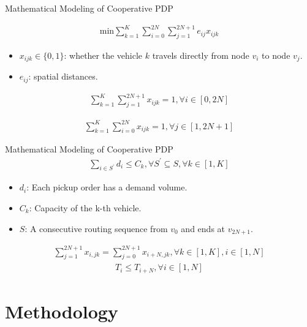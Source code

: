 \documentclass{beamer}
\begin{document}
\begin{frame}{Mathematical Modeling of Cooperative PDP}
	\centering

	\begin{align}
		\mathrm{min} \sum_{k=1}^{K}\sum_{i=0}^{2N}\sum_{j=1}^{2N+1}e_{ij}x_{ijk}
	\end{align}
	\begin{itemize}
		\small
		\item $x_{ijk}\in\{0,1\}$: whether the vehicle $k$ travels directly from node $v_i$ to node $v_j$.
		\item $e_{ij}$: spatial distances.
	\end{itemize}
	\begin{align}
		\sum_{k=1}^{K}\sum_{j=1}^{2N+1}x_{ijk}=1,\forall i\in[0,2N]
	\end{align}

	\begin{align}
		\sum_{k=1}^{K}\sum_{i=0}^{2N}x_{ijk}=1,\forall j\in[1,2N+1]
	\end{align}
\end{frame}

\begin{frame}{Mathematical Modeling of Cooperative PDP}
	\begin{align}
		\sum_{i\in S^{\prime}}d_{i}\leq C_{k},\forall S^{\prime}\subseteq S,\forall k\in[1,K]
	\end{align}
	\begin{itemize}
		\small
		\item $d_i$: Each pickup order has a demand volume.
		\item $C_k$: Capacity of the k-th vehicle.
		\item $S$: A consecutive routing sequence from $v_0$ and ends at $v_{2N+1}$.
	\end{itemize}
	\begin{align}
		\sum_{j=1}^{2N+1}x_{i,jk}=\sum_{j=0}^{2N+1}x_{i+N,jk},\forall k\in[1,K],i\in[1,N]
	\end{align}
	\begin{align}
		T_{i}\leq T_{i+N},\forall i\in[1,N]
	\end{align}

\end{frame}

\section{Methodology}
\end{document}

